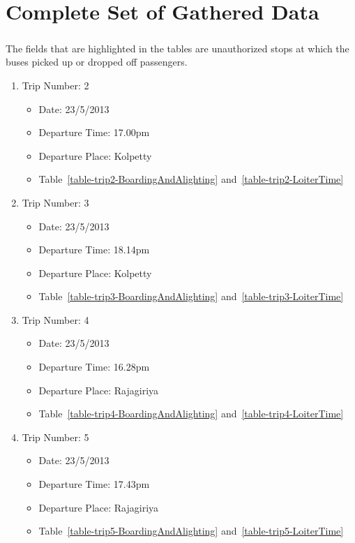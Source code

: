 
\appendix
\chapter{Complete Set of Gathered Data}
\label{appendix-CompleteSetOfData}

\paragraph{ } The fields that are highlighted in the tables are unauthorized stops at which the buses picked up or dropped off passengers.

\begin{enumerate}

\item Trip Number: 2
\begin{itemize}
\item Date: 23/5/2013
\item Departure Time: 17.00pm
\item Departure Place: Kolpetty
\item Table~\ref{table-trip2-BoardingAndAlighting} and~\ref{table-trip2-LoiterTime}
\end{itemize}

\item Trip Number: 3
\begin{itemize}
\item Date: 23/5/2013
\item Departure Time: 18.14pm
\item Departure Place: Kolpetty
\item Table~\ref{table-trip3-BoardingAndAlighting} and~\ref{table-trip3-LoiterTime}
\end{itemize}

\item Trip Number: 4
\begin{itemize}
\item Date: 23/5/2013
\item Departure Time: 16.28pm
\item Departure Place: Rajagiriya
\item Table~\ref{table-trip4-BoardingAndAlighting} and~\ref{table-trip4-LoiterTime}
\end{itemize}

\item Trip Number: 5
\begin{itemize}
\item Date: 23/5/2013
\item Departure Time: 17.43pm
\item Departure Place: Rajagiriya
\item Table~\ref{table-trip5-BoardingAndAlighting} and~\ref{table-trip5-LoiterTime}
\end{itemize}

\end{enumerate}

